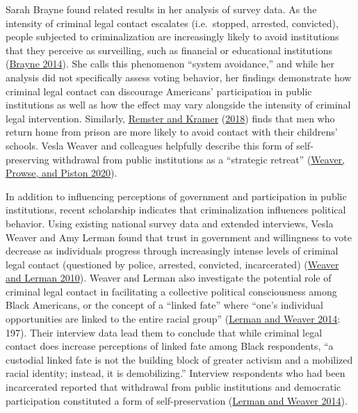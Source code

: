 \documentclass[
  12pt,
]{article}
\begin{document}
Sarah Brayne found related results in her analysis of survey data. As the intensity of criminal legal contact escalates (i.e.~stopped, arrested, convicted), people subjected to criminalization are increasingly likely to avoid institutions that they perceive as surveilling, such as financial or educational institutions (\protect\hyperlink{ref-Brayne2014}{Brayne 2014}). She calls this phenomenon ``system avoidance,'' and while her analysis did not specifically assess voting behavior, her findings demonstrate how criminal legal contact can discourage Americans' participation in public institutions as well as how the effect may vary alongside the intensity of criminal legal intervention. Similarly, \protect\hyperlink{ref-Remster2018a}{Remster and Kramer} (\protect\hyperlink{ref-Remster2018a}{2018}) finds that men who return home from prison are more likely to avoid contact with their childrens' schools. Vesla Weaver and colleagues helpfully describe this form of self-preserving withdrawal from public institutions as a ``strategic retreat'' (\protect\hyperlink{ref-Weaver2020}{Weaver, Prowse, and Piston 2020}).

In addition to influencing perceptions of government and participation in public institutions, recent scholarship indicates that criminalization influences political behavior. Using existing national survey data and extended interviews, Vesla Weaver and Amy Lerman found that trust in government and willingness to vote decrease as individuals progress through increasingly intense levels of criminal legal contact (questioned by police, arrested, convicted, incarcerated) (\protect\hyperlink{ref-Weaver2010}{Weaver and Lerman 2010}). Weaver and Lerman also investigate the potential role of criminal legal contact in facilitating a collective political consciousness among Black Americans, or the concept of a ``linked fate'' where ``one's individual opportunities are linked to the entire racial group'' (\protect\hyperlink{ref-Lerman2014}{Lerman and Weaver 2014}: 197). Their interview data lead them to conclude that while criminal legal contact does increase perceptions of linked fate among Black respondents, ``a custodial linked fate is not the building block of greater activism and a mobilized racial identity; instead, it is demobilizing.'' Interview respondents who had been incarcerated reported that withdrawal from public institutions and democratic participation constituted a form of self-preservation (\protect\hyperlink{ref-Lerman2014}{Lerman and Weaver 2014}).
\end{document}
